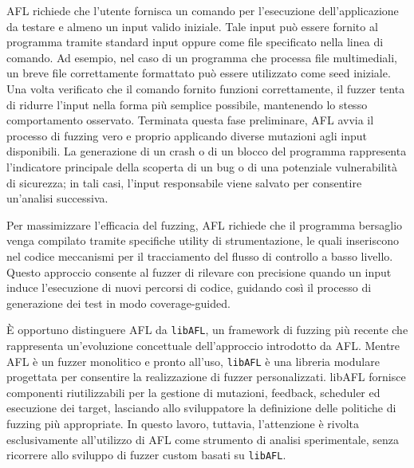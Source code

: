 AFL richiede che l'utente fornisca un comando per l'esecuzione dell'applicazione da testare e almeno un input valido iniziale.
Tale input può essere fornito al programma tramite standard input oppure come file specificato nella linea di comando.
Ad esempio, nel caso di un programma che processa file multimediali, un breve file correttamente formattato può essere utilizzato come seed iniziale.
Una volta verificato che il comando fornito funzioni correttamente, il fuzzer tenta di ridurre l'input nella forma più semplice possibile, mantenendo lo stesso comportamento osservato.
Terminata questa fase preliminare, AFL avvia il processo di fuzzing vero e proprio applicando diverse mutazioni agli input disponibili. La generazione di un crash o di un blocco del programma rappresenta l'indicatore principale della scoperta di un bug o di una potenziale vulnerabilità di sicurezza; in tali casi, l'input responsabile viene salvato per consentire un'analisi successiva.

Per massimizzare l'efficacia del fuzzing, AFL richiede che il programma bersaglio venga compilato tramite specifiche utility di strumentazione, le quali inseriscono nel codice meccanismi per il tracciamento del flusso di controllo a basso livello. Questo approccio consente al fuzzer di rilevare con precisione quando un input induce l'esecuzione di nuovi percorsi di codice, guidando così il processo di generazione dei test in modo coverage-guided.

È opportuno distinguere AFL da \texttt{libAFL}, un framework di fuzzing più recente che rappresenta un’evoluzione concettuale dell’approccio introdotto da AFL. Mentre AFL è un fuzzer monolitico e pronto all’uso, \texttt{libAFL} è una libreria modulare progettata per consentire la realizzazione di fuzzer personalizzati.
libAFL fornisce componenti riutilizzabili per la gestione di mutazioni, feedback, scheduler ed esecuzione dei target, lasciando allo sviluppatore la definizione delle politiche di fuzzing più appropriate. In questo lavoro, tuttavia, l’attenzione è rivolta esclusivamente all’utilizzo di AFL come strumento di analisi sperimentale, senza ricorrere allo sviluppo di fuzzer custom basati su \texttt{libAFL}.

